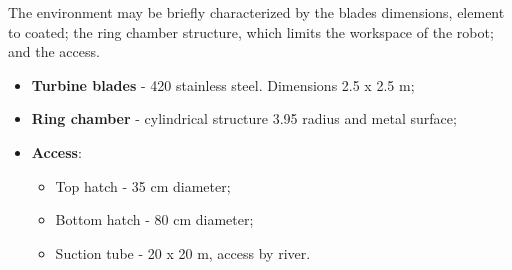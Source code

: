 The environment may be briefly characterized by the blades dimensions,
element to coated; the ring chamber structure, which limits
the workspace of the robot; and the access.

\begin{itemize}
  \item \textbf{Turbine blades} - 420 stainless steel. Dimensions 2.5 x 2.5 m;
  \item \textbf{Ring chamber} - cylindrical structure 3.95 radius and metal
  surface;
  \item \textbf{Access}: 
  	\begin{itemize}
    	\item Top hatch - 35 cm diameter;
  		\item Bottom hatch - 80 cm diameter;
  		\item Suction tube - 20 x 20 m, access by river. 
  	\end{itemize}
\end{itemize}






